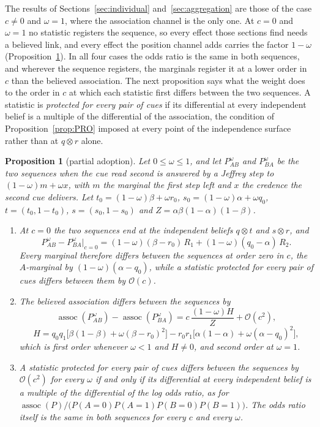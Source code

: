 \documentclass[a4paper,fleqn]{cas-sc}
\newtheorem{proposition}{Proposition}
\theoremstyle{remark}
\theoremstyle{definition}
\newcommand{\assoc}{\operatorname{assoc}}
\newcommand{\bigO}{\mathcal{O}}
\begin{document}
The results of Sections~\ref{sec:individual} and~\ref{sec:aggregation} are those of the case $c\neq0$ and $\omega=1$, where the association channel is the only one. At $c=0$ and $\omega=1$ no statistic registers
the sequence, so every effect those sections find needs a believed link, and every effect the position channel adds carries the factor $1-\omega$ (Proposition~\ref{prop:LAD}). In all four cases the odds ratio is the same in both sequences, and wherever the sequence registers, the marginals register it at a lower order in $c$ than the believed association. The next proposition says what the weight does to the order in $c$ at which each statistic first differs between the two sequences. A statistic is \emph{protected for every pair of cues} if its differential at every independent belief is a multiple of the differential of the association, the condition of Proposition~\ref{prop:PRO} imposed at every point of the independence surface rather than at $q\otimes r$ alone.


\par
\renewcommand{\theproposition}{LAD}%
\begin{proposition}[partial adoption]\label{prop:LAD}
Let $0\le\omega\le1$, and let $P^{\omega}_{AB}$ and $P^{\omega}_{BA}$ be the two sequences when the
cue read second is answered by a Jeffrey step to $(1-\omega)m+\omega x$, with $m$ the marginal
the first step left and $x$ the credence the second cue delivers. Let
$t_0=(1-\omega)\beta+\omega r_0$, $s_0=(1-\omega)\alpha+\omega q_0$,
$t=(t_0,1-t_0)$, $s=(s_0,1-s_0)$ and $Z=\alpha\beta(1-\alpha)(1-\beta)$.
\begin{enumerate}
\item[(i)] At $c=0$ the two sequences end at the independent beliefs $q\otimes t$
and $s\otimes r$, and
\[
  P^{\omega}_{AB}-P^{\omega}_{BA}\big|_{c=0}
  =(1-\omega)(\beta-r_0)\,R_1+(1-\omega)(q_0-\alpha)\,R_2 .
\]
Every marginal therefore differs between the sequences at order zero in $c$, the
$A$-marginal by $(1-\omega)(\alpha-q_0)$, while a statistic protected for every pair
of cues differs between them by $\bigO(c)$.
\item[(ii)] The believed association differs between the sequences by
\[
  \assoc(P^{\omega}_{AB})-\assoc(P^{\omega}_{BA})=c\,\frac{(1-\omega)H}{Z}+\bigO(c^{2}),
\]
\[
  H=q_0q_1\bigl[\beta(1-\beta)+\omega(\beta-r_0)^2\bigr]
   -r_0r_1\bigl[\alpha(1-\alpha)+\omega(\alpha-q_0)^2\bigr],
\]
which is first order whenever $\omega<1$ and $H\neq0$, and second order at $\omega=1$.
\item[(iii)] A statistic protected for every pair of cues differs between the
sequences by $\bigO(c^{2})$ for every $\omega$ if and only if its differential at
every independent belief is a multiple of the differential of the log odds ratio,
as for $\assoc(P)/\bigl(P(A{=}0)P(A{=}1)P(B{=}0)P(B{=}1)\bigr)$. The odds ratio
itself is the same in both sequences for every $c$ and every $\omega$.
\end{enumerate}
\end{proposition}
\par
\end{document}

